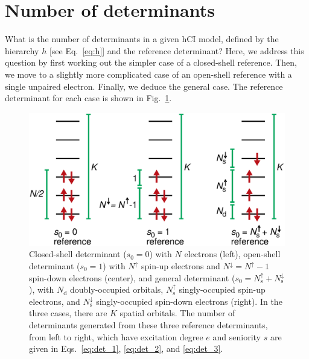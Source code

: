 \documentclass[aip,jcp,reprint,noshowkeys,superscriptaddress]{revtex4-1}
\newcommand{\Na}{N^{\uparrow}}
\newcommand{\Nb}{N^{\downarrow}}
\newcommand{\Nd}{N_\text{d}}
\newcommand{\Nas}{N_\text{s}^{\uparrow}}
\newcommand{\Nbs}{N_\text{s}^{\downarrow}}
\begin{document}

\appendix

\section{Number of determinants}
\label{app:appendix}

What is the number of determinants in a given hCI model, defined by the hierarchy $h$ [see Eq.~\eqref{eq:h}] and the reference determinant?
Here, we address this question by first working out the simpler case of a closed-shell reference.
Then, we move to a slightly more complicated case of an open-shell reference with a single unpaired electron.
Finally, we deduce the general case.
The reference determinant for each case is shown in Fig.~\ref{fig:appendix}.

\begin{figure}[h!]
\includegraphics[width=1.0\linewidth]{determinants_appendix}
\caption{
Closed-shell determinant ($s_0=0$) with $N$ electrons (left),
open-shell determinant ($s_0=1$) with $\Na$ spin-up electrons and $\Nb=\Na-1$ spin-down electrons (center),
and general determinant ($s_0=\Nas+\Nbs$), with $\Nd$ doubly-occupied orbitals, $\Nas$ singly-occupied spin-up electrons, and $\Nbs$ singly-occupied spin-down electrons (right).
In the three cases, there are $K$ spatial orbitals.
The number of determinants generated from these three reference determinants, from left to right, which have excitation degree $e$ and seniority $s$
are given in Eqs.~\eqref{eq:det_1}, \eqref{eq:det_2}, and \eqref{eq:det_3}.
}
\label{fig:appendix}
\end{figure}
\end{document}
